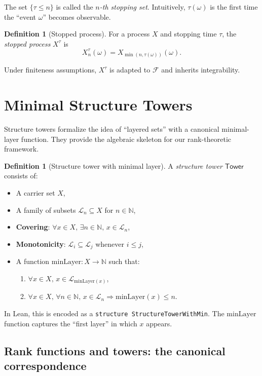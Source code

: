 \documentclass[11pt]{article}
\theoremstyle{definition}
\newtheorem{definition}[theorem]{Definition}
\theoremstyle{remark}
\newcommand{\layer}{\mathcal{L}}
\newcommand{\minLayer}{\mathrm{minLayer}}
\newcommand{\Tower}{\mathsf{Tower}}
\newcommand{\Filtration}{\mathcal{F}}
\newcommand{\NN}{\mathbb{N}}
\begin{document}
The set $\{\tau \leq n\}$ is called the \emph{$n$-th stopping set}.
Intuitively, $\tau(\omega)$ is the first time the ``event $\omega$'' becomes observable.

\begin{definition}[Stopped process]
\label{def:stopped-process}
For a process $X$ and stopping time $\tau$, the \emph{stopped process} $X^\tau$ is
\[
X^\tau_n(\omega) = X_{\min(n, \tau(\omega))}(\omega).
\]
\end{definition}

Under finiteness assumptions, $X^\tau$ is adapted to $\Filtration$ and inherits integrability.

\section{Minimal Structure Towers}
\label{sec:tower}

Structure towers formalize the idea of ``layered sets'' with a canonical minimal-layer function.
They provide the algebraic skeleton for our rank-theoretic framework.

\begin{definition}[Structure tower with minimal layer]
\label{def:tower}
A \emph{structure tower} $\Tower$ consists of:
\begin{itemize}
\item A carrier set $X$,
\item A family of subsets $\layer_n \subseteq X$ for $n \in \NN$,
\item \textbf{Covering}: $\forall x \in X, \, \exists n \in \NN, \, x \in \layer_n$,
\item \textbf{Monotonicity}: $\layer_i \subseteq \layer_j$ whenever $i \leq j$,
\item A function $\minLayer: X \to \NN$ such that:
  \begin{enumerate}
  \item $\forall x \in X, \, x \in \layer_{\minLayer(x)}$,
  \item $\forall x \in X, \, \forall n \in \NN, \, x \in \layer_n \Rightarrow \minLayer(x) \leq n$.
  \end{enumerate}
\end{itemize}
\end{definition}

In Lean, this is encoded as a \texttt{structure StructureTowerWithMin}.
The $\minLayer$ function captures the ``first layer'' in which $x$ appears.

\subsection{Rank functions and towers: the canonical correspondence}
\end{document}
